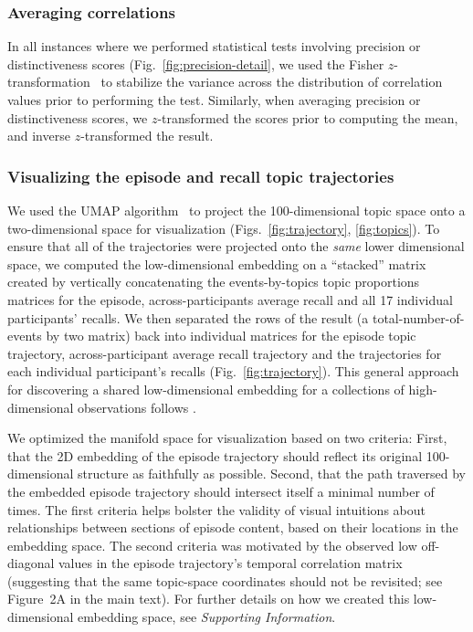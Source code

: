 \documentclass[10pt]{article}
\begin{document}
\subsubsection*{Averaging correlations}
In all instances where we performed statistical tests involving precision or distinctiveness scores (Fig.~\ref{fig:precision-detail}, we used the Fisher $z$-transformation~\citep{Fish25} to stabilize the variance across the distribution of correlation values prior to performing the test.  Similarly, when averaging precision or distinctiveness scores, we $z$-transformed the scores prior to computing the mean, and inverse $z$-transformed the result.

\subsubsection*{Visualizing the episode and recall topic trajectories}
We used the UMAP algorithm~\citep{McInEtal18} to project the 100-dimensional topic space onto a two-dimensional space for visualization (Figs.~\ref{fig:trajectory}, \ref{fig:topics}).  To ensure that all of the trajectories were projected onto the \textit{same} lower dimensional space, we computed the low-dimensional embedding on a ``stacked'' matrix created by vertically concatenating the events-by-topics topic proportions matrices for the episode, across-participants average recall and all 17 individual participants' recalls.  We then separated the rows of the result (a total-number-of-events by two matrix) back into individual matrices for the episode topic trajectory, across-participant average recall trajectory and the trajectories for each individual participant's recalls (Fig.~\ref{fig:trajectory}).  This general approach for discovering a shared low-dimensional embedding for a collections of high-dimensional observations follows \cite{HeusEtal18a}.

We optimized the manifold space for visualization based on two criteria: First, that the 2D embedding of the episode trajectory should reflect its original 100-dimensional structure as faithfully as possible. Second, that the path traversed by the embedded episode trajectory should intersect itself a minimal number of times.  The first criteria helps bolster the validity of visual intuitions about relationships between sections of episode content, based on their locations in the embedding space.  The second criteria was motivated by the observed low off-diagonal values in the episode trajectory's temporal correlation matrix (suggesting that the same topic-space coordinates should not be revisited; see Figure~2A in the main text). For further details on how we created this low-dimensional embedding space, see \textit{Supporting Information}.
\end{document}
